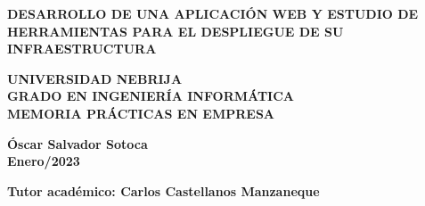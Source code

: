 \documentclass[11pt]{article}
\begin{document}
	\begin{titlepage}
		{\color{white}{.}}
		\linebreak
		\linebreak
		
		\centering
		\linebreak
		\vspace{3cm}
		
		{\LARGE\textbf{\color{RojoNebrija}DESARROLLO DE UNA APLICACIÓN WEB Y ESTUDIO DE HERRAMIENTAS PARA EL DESPLIEGUE DE SU INFRAESTRUCTURA}\par}
		\vspace{2cm}
		
		{\Large \textbf{\color{black}UNIVERSIDAD NEBRIJA \\ GRADO EN INGENIERÍA INFORMÁTICA \\ MEMORIA PRÁCTICAS EN EMPRESA}\par}
		\vspace{2cm}
		

		{\Large \textbf{ Óscar Salvador Sotoca\\ Enero/2023}\par}
		\vspace{2cm}

		{\Large \textbf{Tutor académico: Carlos Castellanos Manzaneque}\par}
		\vspace{2cm}
						
		
		
		
	\end{titlepage}


\tableofcontents

\clearpage
\listoffigures
\end{document}
